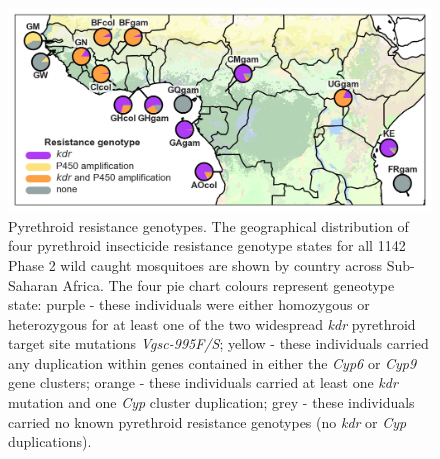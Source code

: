 \documentclass[a4paper,11pt,abstracton,hidelinks]{scrartcl}
\begin{document}

\begin{figure}[H]
	\begin{center}
		\includegraphics*[width=6.3in]{artwork/pyrethroid_resistance_simplified.jpg}
	\end{center}
	\caption{Pyrethroid resistance genotypes. The geographical distribution of four pyrethroid insecticide resistance genotype states for all 1142 Phase 2 wild caught mosquitoes are shown by country across Sub-Saharan Africa. The four pie chart colours represent geneotype state: purple - these individuals were either homozygous or heterozygous for at least one of the two widespread \textit{kdr} pyrethroid target site mutations \textit{Vgsc-995F/S}; yellow - these individuals carried any duplication within genes contained in either the \textit{Cyp6} or \textit{Cyp9} gene clusters; orange - these individuals carried at least one \textit{kdr} mutation and one \textit{Cyp} cluster duplication; grey - these individuals carried no known pyrethroid resistance genotypes (no \textit{kdr} or \textit{Cyp} duplications).}
	\label{ir}
\end{figure}
\end{document}
